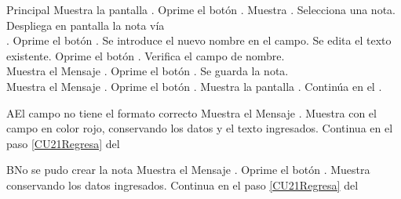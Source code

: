 \begin{UCtrayectoria}{Principal}
    \UCpaso Muestra la pantalla .
    \UCpaso[\UCactor] Oprime el botón .
    \UCpaso Muestra .
    \UCpaso[\UCactor] Selecciona una nota.
    \UCpaso Despliega en pantalla la nota vía
        \\.
    \UCpaso[\UCactor] Oprime el botón .
    \UCpaso[\UCactor] Se introduce el nuevo nombre en el campo.
    \UCpaso[\UCactor] Se edita el texto existente.
    \UCpaso[\UCactor] Oprime el botón . \label{CU21Regresa}  
    \UCpaso Verifica el campo de nombre. 
    	\\
    \UCpaso Muestra el Mensaje \textbf{}.
    \UCpaso[\UCactor] Oprime el botón .
    \UCpaso Se guarda la nota. 
    	\\
    \UCpaso Muestra el Mensaje \textbf{}.
    \UCpaso[\UCactor] Oprime el botón .
    \UCpaso Muestra la pantalla .
    \UCpaso Continúa en el .
\end{UCtrayectoria}


\begin{UCtrayectoriaA}{A}{El campo no tiene el formato correcto}
    \UCpaso Muestra el Mensaje \textbf{}.
    \UCpaso Muestra  con el campo en color rojo, conservando los datos y el texto ingresados.
	\UCpaso Continua en el paso \ref{CU21Regresa} del 
\end{UCtrayectoriaA}

\begin{UCtrayectoriaA}{B}{No se pudo crear la nota}
    \UCpaso Muestra el Mensaje \textbf{}.
    \UCpaso[\UCactor] Oprime el botón .
    \UCpaso Muestra  conservando los datos ingresados.
    \UCpaso Continua en el paso \ref{CU21Regresa} del 
\end{UCtrayectoriaA}

